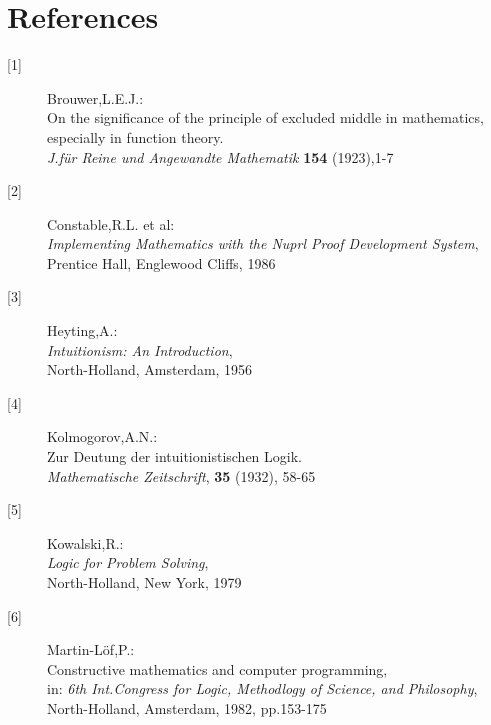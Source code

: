 \documentclass[11pt]{report}
\begin{document}
 \chapter*{References}
 
 \begin{description}
 
 \item[{[1]}]
 \begin{tabbing}
 Brouwer,L.E.J.:\\
 On the significance of the principle of excluded middle in
 mathematics, \\
 especially in function theory.\\
 \emph{J.f\"{u}r Reine und Angewandte Mathematik} {\bf 154} (1923),1-7
 \end{tabbing}
 
 \item[{[2]}]
 \begin{tabbing}
 Constable,R.L. et al:\\
  \emph{Implementing Mathematics with the
 Nuprl Proof Development System},\\
 Prentice Hall, Englewood Cliffs, 1986
 \end{tabbing}
 
 \item[{[3]}]
 \begin{tabbing}
 Heyting,A.: \\ 
 \emph{Intuitionism: An Introduction}, \\
 North-Holland, Amsterdam, 1956
 \end{tabbing}
 
 \item[{[4]}]
 \begin{tabbing}
 Kolmogorov,A.N.: \\
 Zur Deutung der intuitionistischen Logik.\\
 \emph{Mathematische Zeitschrift}, {\bf 35} (1932), 58-65
 \end{tabbing}
 
 \item[{[5]}]
 \begin{tabbing}
 Kowalski,R.: \\
 \emph{Logic for Problem Solving},\\
 North-Holland, New York, 1979
 \end{tabbing}
 
 \item[{[6]}]
 \begin{tabbing}
 Martin-L\"{o}f,P.: \\
 Constructive mathematics and computer programming,\\
 in: \emph{6th Int.Congress for Logic, Methodlogy of Science, and
 Philosophy}, \\
 North-Holland, Amsterdam, 1982, pp.153-175
 \end{tabbing}
 

\end{description}
\end{document}
